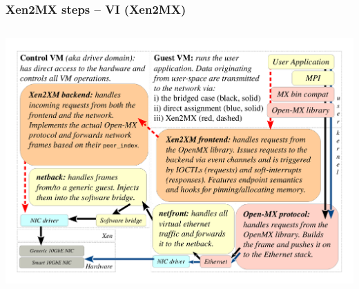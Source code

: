 \documentclass[red,slidestop,notes,compress,mathserif]{beamer}
\begin{document}
\begin{frame}
\frametitle{Xen2MX steps -- VI (Xen2MX)}
\begin{columns}
\includegraphics[width=\textwidth]{figs/bare/xen2mx_step6.pdf}
\end{columns}
\end{frame}
\end{document}
